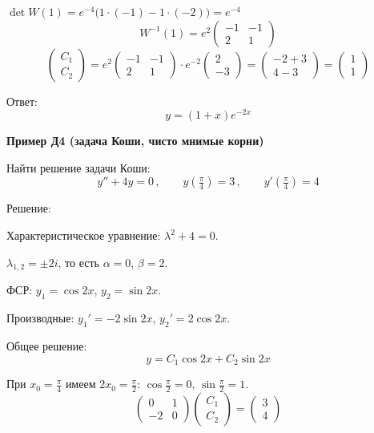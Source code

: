 \documentclass[11pt,a4paper]{article}
\newcommand{\example}[1]{\par\medskip\noindent\textbf{#1}\par\nopagebreak\smallskip}
\begin{document}
$\det W(1) = e^{-4}\bigl(1 \cdot (-1) - 1 \cdot (-2)\bigr) = e^{-4}$
\[
  W^{-1}(1) = e^{2} \begin{pmatrix} -1 & -1 \\ 2 & 1 \end{pmatrix}
\]
\[
  \begin{pmatrix} C_1 \\ C_2 \end{pmatrix}
  = e^{2} \begin{pmatrix} -1 & -1 \\ 2 & 1 \end{pmatrix} \cdot e^{-2} \begin{pmatrix} 2 \\ -3 \end{pmatrix}
  = \begin{pmatrix} -2 + 3 \\ 4 - 3 \end{pmatrix}
  = \begin{pmatrix} 1 \\ 1 \end{pmatrix}
\]

Ответ:
\[
  y = (1 + x)e^{-2x}
\]

\example{Пример Д4 (задача Коши, чисто мнимые корни)}

Найти решение задачи Коши:
\[
  y'' + 4y = 0\,, \qquad y\!\left(\tfrac{\pi}{4}\right) = 3\,, \qquad y'\!\left(\tfrac{\pi}{4}\right) = 4
\]

Решение:

Характеристическое уравнение: $\lambda^2 + 4 = 0$.

$\lambda_{1,2} = \pm 2i$, то есть $\alpha = 0$, $\beta = 2$.

ФСР: $y_1 = \cos 2x$, $y_2 = \sin 2x$.

Производные: $y_1' = -2\sin 2x$, $y_2' = 2\cos 2x$.

Общее решение:
\[
  y = C_1\cos 2x + C_2\sin 2x
\]

При $x_0 = \tfrac{\pi}{4}$ имеем $2x_0 = \tfrac{\pi}{2}$: $\cos\tfrac{\pi}{2} = 0$, $\sin\tfrac{\pi}{2} = 1$.
\[
  \begin{pmatrix} 0 & 1 \\ -2 & 0 \end{pmatrix}
  \begin{pmatrix} C_1 \\ C_2 \end{pmatrix}
  =
  \begin{pmatrix} 3 \\ 4 \end{pmatrix}
\]
\end{document}
